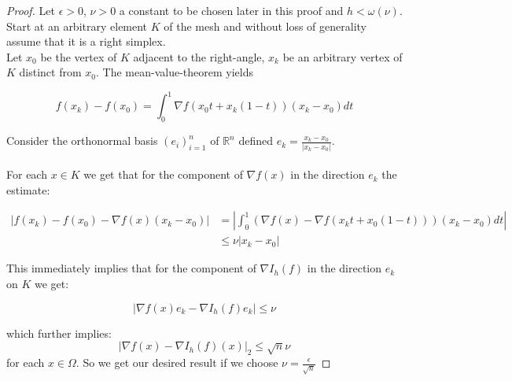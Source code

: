 \documentclass[11pt,a4paper,leqno]{report}
\numberwithin{equation}{chapter}
\begin{document}
\begin{proof} Let $\epsilon>0$, $\nu>0$ a constant to be chosen later in this proof and $h<\omega(\nu)$.
Start at an arbitrary element $K$ of the mesh and without loss of generality assume that it is a right simplex.\\
Let $x_0$ be the vertex of $K$ adjacent to the right-angle, $x_k$ be an arbitrary vertex of $K$ distinct from $x_0$. The mean-value-theorem yields
\begin{small}\begin{equation*}f(x_k)-f(x_0)=\int_0^1\nabla f(x_0 t+x_k(1-t))(x_k-x_0)dt\end{equation*}\end{small} 
Consider the orthonormal basis $(e_i)_{i=1}^n$ of $\mathbb{R}^n$ defined $e_k=\frac{x_k-x_0}{|x_k-x_0|}$. \\
\\
For each $x\in K$ we get that for the component of $\nabla f(x)$ in the direction $e_k$ the estimate:
\begin{small}\begin{align*}|f(x_k)-f(x_0)-\nabla f(x)(x_k-x_0)|&=|\int_0^1(\nabla f(x)-\nabla f(x_k t+x_0(1-t)))(x_k-x_0)dt|\\&\leq\nu|x_k-x_0|\end{align*}\end{small} 
This immediately implies that for the component of $\nabla I_h(f)$ in the direction $e_k$ on $K$ we get:
\begin{small}\begin{equation*}|\nabla f(x)e_k-\nabla I_h(f)e_k|\leq\nu\end{equation*}\end{small}
which further implies:
\begin{equation*}|\nabla f(x)-\nabla I_h(f)(x)|_2\leq\sqrt{n}\nu\end{equation*} for each $x\in \Omega$. So we get our desired result if we choose $\nu=\frac{\epsilon}{\sqrt{n}}$
\end{proof}
\end{document}
